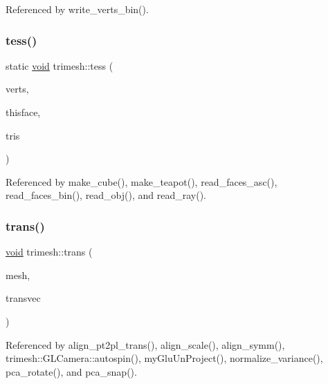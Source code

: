 Referenced by write\+\_\+verts\+\_\+bin().

\mbox{\label{namespacetrimesh_ab9faa1a09be480a9b7b63874e84d514c}} 
\subsubsection{\texorpdfstring{tess()}{tess()}}
{\footnotesize\ttfamily static \hyperlink{namespacetrimesh_a784ddfd979e1c579bda795a8edfc3f43}{void} trimesh\+::tess (\begin{DoxyParamCaption}\item[{const vector$<$ \hyperlink{namespacetrimesh_a325b99fd6454b22fa4c4bc3223271b2c}{point} $>$ \&}]{verts,  }\item[{const vector$<$ int $>$ \&}]{thisface,  }\item[{vector$<$ \hyperlink{classtrimesh_1_1TriMesh_a06cb64bb6435d5cf4d7b24d2950fe8e7}{Tri\+Mesh\+::\+Face} $>$ \&}]{tris }\end{DoxyParamCaption})\hspace{0.3cm}{\ttfamily [static]}}



Referenced by make\+\_\+cube(), make\+\_\+teapot(), read\+\_\+faces\+\_\+asc(), read\+\_\+faces\+\_\+bin(), read\+\_\+obj(), and read\+\_\+ray().

\mbox{\label{namespacetrimesh_ab21687effea4389b4cb46ae1bce1576b}} 
\subsubsection{\texorpdfstring{trans()}{trans()}}
{\footnotesize\ttfamily \hyperlink{namespacetrimesh_a784ddfd979e1c579bda795a8edfc3f43}{void} trimesh\+::trans (\begin{DoxyParamCaption}\item[{\hyperlink{classtrimesh_1_1TriMesh}{Tri\+Mesh} $\ast$}]{mesh,  }\item[{const \hyperlink{namespacetrimesh_a4fc2b83feba99c931f837a0c7d4b4df1}{vec} \&}]{transvec }\end{DoxyParamCaption})}



Referenced by align\+\_\+pt2pl\+\_\+trans(), align\+\_\+scale(), align\+\_\+symm(), trimesh\+::\+G\+L\+Camera\+::autospin(), my\+Glu\+Un\+Project(), normalize\+\_\+variance(), pca\+\_\+rotate(), and pca\+\_\+snap().

